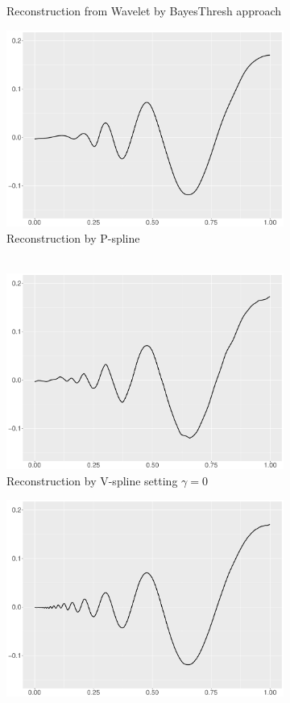 \begin{figure}
\begin{subfigure}{0.45\textwidth}
    \caption{Reconstruction from Wavelet by BayesThresh approach}
    \end{subfigure}
    \begin{subfigure}{0.45\textwidth}
    \centering
    \includegraphics[width=\linewidth,height=0.45\textwidth]{Chapters/02TractorSplineTheory/plot/ggplot/ggDopplerPSpline.pdf}
    \caption{Reconstruction by P-spline \\ \mbox{  } }
    \end{subfigure}
    \begin{subfigure}{0.45\textwidth}
    \centering
    \includegraphics[width=\linewidth,height=0.45\textwidth]{Chapters/02TractorSplineTheory/plot/ggplot/ggDopplerGamma.pdf}
    \caption{Reconstruction by V-spline setting $\gamma=0$}
    \end{subfigure}
  \begin{subfigure}{0.45\textwidth}
    \centering
    \includegraphics[width=\linewidth,height=0.45\textwidth]{Chapters/02TractorSplineTheory/plot/ggplot/ggDopplerTractorAPT.pdf}

\end{subfigure}
\end{figure}
